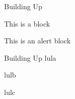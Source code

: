 \begin{frame}{Building Up}
    \begin{block}{This is a block}
        \lipsum[1][1-3]
    \end{block}   
    \begin{alertblock}{This is an alert block}
        \lipsum[2][2-5]
    \end{alertblock}  
    
\end{frame}

\begin{frame}{Building Up}
lula 

lulb 

lulc 
    
\end{frame}
